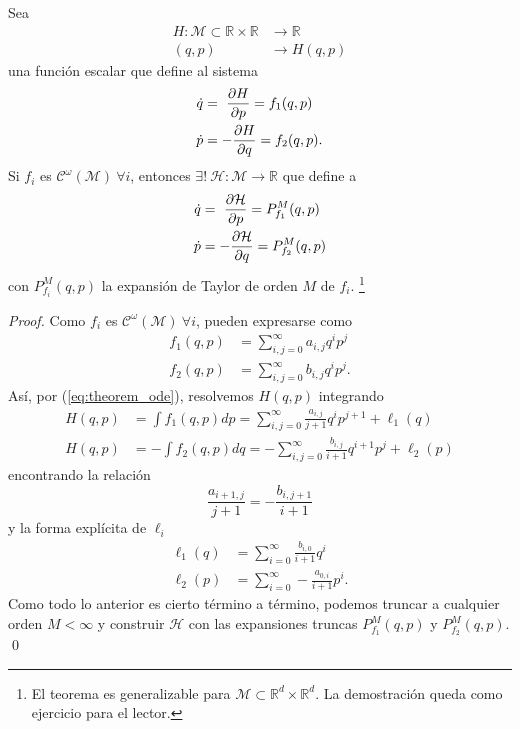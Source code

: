 \begin{teorema}
Sea 
\begin{align*}
  H: \mathcal{M} \subset \mathbb{R} \times\mathbb{R} &\to \mathbb{R} \\ 
  (q,p) &\to H(q,p)
\end{align*}
una función escalar que define al sistema
\begin{align}
 \dot{q} &= \ \frac{\partial H}{\partial p} = f_1(q,p) \nonumber \\
 \dot{p} &= - \frac{\partial H}{\partial q} = f_2(q,p).
 \label{eq:theorem_ode}
\end{align}
Si $f_i$ es $\mathcal{C}^\omega(\mathcal{M}) \ \forall i$, entonces $\exists! \  \mathcal{H}: \mathcal{M} \to \mathbb{R}$ que define a
\begin{align*}
 \dot{q} &= \ \frac{\partial \mathcal{H}}{\partial p} = P_{f_1}^M(q,p) \\
 \dot{p} &= - \frac{\partial \mathcal{H}}{\partial q} = P_{f_2}^M(q,p)
\end{align*}
con $P_{f_i}^M(q,p)$ la expansión de Taylor de orden $M$ de $f_i$.
\footnote{El teorema es generalizable para $\mathcal{M} \subset \mathbb{R}^d \times \mathbb{R}^d$. La demostración queda como ejercicio para el lector.}
\end{teorema}

\begin{proof}
Como $f_i$ es $\mathcal{C}^\omega(\mathcal{M}) \ \forall i$, pueden expresarse como
\begin{align*}
 f_1(q,p) &= \sum_{i,j = 0}^\infty a_{i,j} q^i p^j \\
 f_2(q,p) &= \sum_{i,j = 0}^\infty b_{i,j} q^i p^j. 
\end{align*}
Así, por (\ref{eq:theorem_ode}), resolvemos $H(q,p)$ integrando
\begin{align*}
 H(q,p) &= \int f_1(q,p) dp = \sum_{i,j = 0}^\infty \frac{a_{i,j}}{j+1} q^i p^{j+1} + \ell_1(q) \\
 H(q,p) &= -\int f_2(q,p) dq = -\sum_{i,j = 0}^\infty \frac{b_{i,j}}{i+1} q^{i+1} p^j + \ell_2(p)
\end{align*}
encontrando la relación 
\begin{equation*}
 \frac{a_{i+1,j}}{j+1} = - \frac{b_{i,j+1}}{i+1} 
\end{equation*}
y la forma explícita de $\ell_i$
\begin{align*}
 \ell_1(q) &= \sum_{i=0}^\infty \frac{b_{i,0}}{i+1} q^i \\
 \ell_2(p) &= \sum_{i=0}^\infty -\frac{a_{0,i}}{i+1} p^i.
\end{align*}
Como todo lo anterior es cierto término a término, podemos truncar a cualquier orden $M < \infty$ y construir $\mathcal{H}$ con las expansiones truncas $P_{f_1}^M(q,p)$ y $P_{f_2}^M(q,p)$. \qed
\end{proof}

